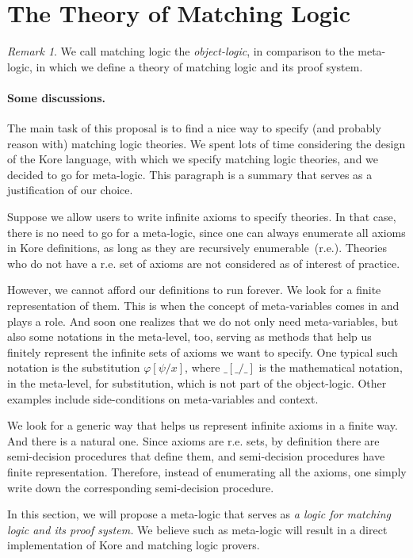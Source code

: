 \documentclass[UTF8]{article}
\newcounter{thmcounter}
\theoremstyle{plain}
\theoremstyle{definition}
\theoremstyle{remark}
\newtheorem{remark}[thmcounter]{Remark}
\begin{document}
\section{The Theory of Matching Logic}

\begin{remark}
	We call matching logic the \emph{object-logic}, in comparison to the meta-logic, in which we define a theory of matching logic and its proof system. 
\end{remark}

\paragraph{Some discussions.}
The main task of this proposal is to find a nice way to specify (and probably reason with) matching logic theories. We spent lots of time considering the design of the Kore language, with which we specify matching logic theories, and we decided to go for meta-logic. This paragraph is a summary that serves as a justification of our choice. 

Suppose we allow users to write infinite axioms to specify theories. In that case, there is no need to go for a meta-logic, since one can always enumerate all axioms in Kore definitions, as long as they are recursively enumerable~(r.e.). Theories who do not have a r.e. set of axioms are not considered as of interest of practice. 

However, we cannot afford our definitions to run forever. We look for a finite representation of them. This is when the concept of meta-variables comes in and plays a role. And soon one realizes that we do not only need meta-variables, but also some notations in the meta-level, too, serving as methods that help us finitely represent the infinite sets of axioms we want to specify. One typical such notation is the substitution $\varphi[\psi/x]$, where $\_[\_/\_]$ is the mathematical notation, in the meta-level, for substitution, which is not part of the object-logic. Other examples include side-conditions on meta-variables and context.

We look for a generic way that helps us represent infinite axioms in a finite way. And there is a natural one. Since axioms are r.e. sets, by definition there are semi-decision procedures that define them, and semi-decision procedures have finite representation. Therefore, instead of enumerating all the axioms, one simply write down the corresponding semi-decision procedure. 

In this section, we will propose a meta-logic that serves as \emph{a logic for matching logic and its proof system.} We believe such as meta-logic will result in a direct implementation of Kore and matching logic provers. 
\end{document}

